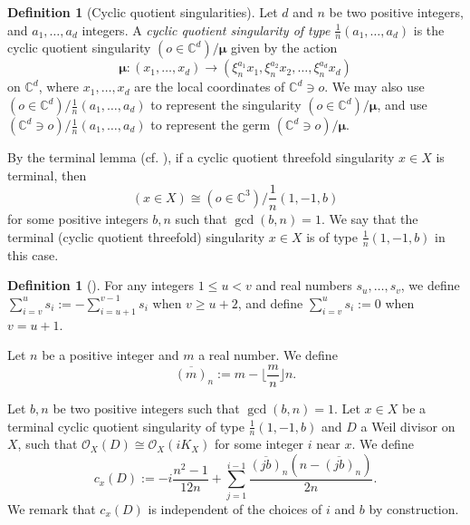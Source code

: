 \documentclass[11pt]{amsart}
\numberwithin{equation}{section}
\theoremstyle{definition}
\newtheorem{rem}[thm]{Remark}
\theoremstyle{definition}
\newtheorem{defn}[thm]{Definition}
\begin{document}
\begin{defn}[Cyclic quotient singularities]
Let $d$ and $n$ be two positive integers, and $a_1,\dots,a_d$ integers. A \emph{cyclic quotient singularity of type} $\frac{1}{n}(a_1,\dots,a_d)$ is the cyclic quotient singularity $(o\in\mathbb C^d)/\bm{\mu}$ given by the action
$$\bm{\mu}:(x_1,\dots,x_d)\rightarrow (\xi_n^{a_1}x_1,\xi_n^{a_2}x_2,\dots,\xi_n^{a_d}x_d)$$
on $\mathbb C^d$, where $x_1,\dots,x_d$ are the local coordinates of $\mathbb C^d\ni o$. We may also use $(o\in\mathbb C^d)/\frac{1}{n}(a_1,\dots,a_d)$ to represent the singularity $(o\in\mathbb C^d)/\bm{\mu}$, and use $(\mathbb C^d\ni o)/\frac{1}{n}(a_1,\dots,a_d)$ to represent the germ $(\mathbb C^d\ni o)/\bm{\mu}$.
\end{defn}


By the terminal lemma (cf. {\cite[Corollary 1.4]{MS84}}), if a cyclic quotient threefold singularity $x\in X$ is terminal, then $$(x\in X)\cong (o\in \mathbb C^3)/\frac{1}{n}(1,-1,b)$$ for some positive integers $b,n$ such that $\gcd(b,n)=1$. We say that the terminal (cyclic quotient threefold) singularity $x\in X$ is of type $\frac{1}{n}(1,-1,b)$ in this case.





\begin{defn}[{\cite[Theorem~10.2(2)]{Rei87}}]\label{defn: generalized sum}
For any integers $1\leq u<v$ and real numbers $s_u,\dots,s_v$, we define
$\sum_{i=v}^u s_i:=-\sum_{i=u+1}^{v-1}s_i$
when $v\geq u+2$, and define $\sum_{i=v}^us_i:=0$ when $v=u+1$.


Let $n$ be a positive integer and $m$ a real number. We define
$$\overline{(m)}_n:=m-\lfloor\frac{m}{n}\rfloor n.$$


Let $b,n$ be two positive integers such that $\gcd(b,n)=1$. Let $x\in X$ be a terminal cyclic quotient singularity of type $\frac{1}{n}(1,-1,b)$ and $D$ a Weil divisor on $X$, such that $\mathcal{O}_{X}(D)\cong\mathcal{O}_X(iK_X)$ for some integer $i$ near $x$. We define
$$c_x(D):=-i\frac{n^2-1}{12n}+\sum_{j=1}^{i-1}\frac{\overline{(jb)}_n(n-\overline{(jb)}_n)}{2n}.$$
We remark that $c_x(D)$ is independent of the choices of $i$ and $b$ by construction.
\end{defn}

\end{document}
